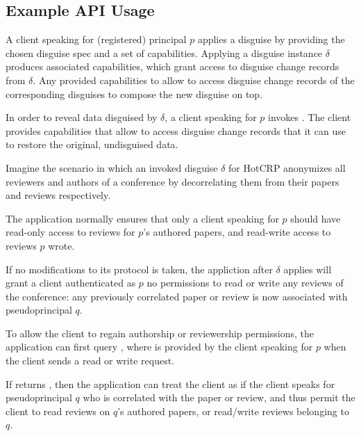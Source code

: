 \subsection{Example API Usage}

A client speaking for (registered) principal $p$ applies a disguise by providing the chosen disguise
spec and a set of capabilities. Applying a disguise instance $\delta$ produces associated
capabilities, which grant access to disguise change records from $\delta$. Any provided capabilities
to  allow \sys to access disguise change records of the corresponding disguises to
compose the new disguise on top.

In order to reveal data disguised by $\delta$, a client speaking for $p$ invokes
.
The client provides capabilities that allow \sys to access disguise change records that it can use to
restore the original, undisguised data.

Imagine the scenario in which an invoked disguise $\delta$ for HotCRP anonymizes all reviewers and authors of a
conference by decorrelating them from their papers and reviews respectively.

The application normally ensures that only a client speaking for $p$ should have read-only access to reviews
for $p$'s authored papers, and read-write access to reviews $p$ wrote.

If no modifications to its protocol is taken, the appliction after $\delta$ applies will grant a
client authenticated as $p$ no permissions to read or write any reviews of the conference: any
previously correlated paper or review is now associated with pseudoprincipal $q$.

To allow the client to regain authorship or reviewership permissions, the application can first
query , where  is provided by the
client speaking for $p$ when the client sends a read or write request.

If  returns , then the application can treat the client as if the 
client speaks for pseudoprincipal $q$ who is correlated with the paper or review, and thus permit
the client to read reviews on $q$'s authored papers, or read/write reviews belonging to $q$.





















